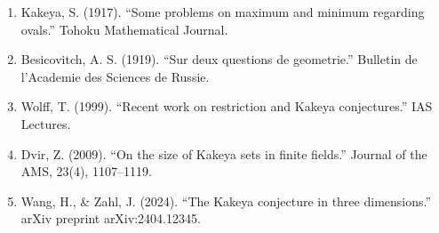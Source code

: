 \begin{enumerate}
\item Kakeya, S. (1917). ``Some problems on maximum and minimum regarding ovals.'' Tohoku Mathematical Journal.
\item Besicovitch, A. S. (1919). ``Sur deux questions de geometrie.'' Bulletin de l'Academie des Sciences de Russie.
\item Wolff, T. (1999). ``Recent work on restriction and Kakeya conjectures.'' IAS Lectures.
\item Dvir, Z. (2009). ``On the size of Kakeya sets in finite fields.'' Journal of the AMS, 23(4), 1107--1119.
\item Wang, H., \& Zahl, J. (2024). ``The Kakeya conjecture in three dimensions.'' arXiv preprint arXiv:2404.12345.
\end{enumerate}
